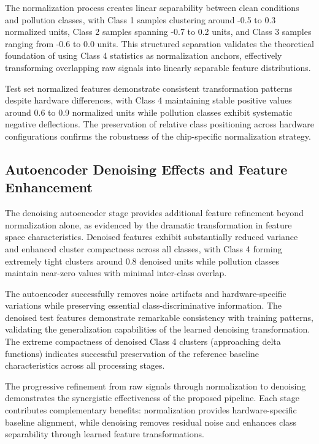 The normalization process creates linear separability between clean conditions and pollution classes, with Class 1 samples clustering around -0.5 to 0.3 normalized units, Class 2 samples spanning -0.7 to 0.2 units, and Class 3 samples ranging from -0.6 to 0.0 units. This structured separation validates the theoretical foundation of using Class 4 statistics as normalization anchors, effectively transforming overlapping raw signals into linearly separable feature distributions.

Test set normalized features demonstrate consistent transformation patterns despite hardware differences, with Class 4 maintaining stable positive values around 0.6 to 0.9 normalized units while pollution classes exhibit systematic negative deflections. The preservation of relative class positioning across hardware configurations confirms the robustness of the chip-specific normalization strategy.

\subsection{Autoencoder Denoising Effects and Feature Enhancement}

The denoising autoencoder stage provides additional feature refinement beyond normalization alone, as evidenced by the dramatic transformation in feature space characteristics. Denoised features exhibit substantially reduced variance and enhanced cluster compactness across all classes, with Class 4 forming extremely tight clusters around 0.8 denoised units while pollution classes maintain near-zero values with minimal inter-class overlap.

The autoencoder successfully removes noise artifacts and hardware-specific variations while preserving essential class-discriminative information. The denoised test features demonstrate remarkable consistency with training patterns, validating the generalization capabilities of the learned denoising transformation. The extreme compactness of denoised Class 4 clusters (approaching delta functions) indicates successful preservation of the reference baseline characteristics across all processing stages.

The progressive refinement from raw signals through normalization to denoising demonstrates the synergistic effectiveness of the proposed pipeline. Each stage contributes complementary benefits: normalization provides hardware-specific baseline alignment, while denoising removes residual noise and enhances class separability through learned feature transformations.

